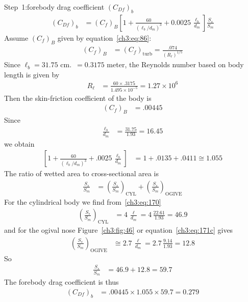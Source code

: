 \medskip\noindent Step~1:\quad forebody drag coefficient $(C_{Df})_b$
\begin{align*}
(C_{Df})_b &= (C_f)_B\left[1 + \frac{60}{(\ell_b/d_m)^3} + 0.0025\,\frac{\ell_b}{d_m}\right]\frac{S_s}{S_m}
\end{align*}
Assume $(C_f)_B$ given by equation~\eqref{ch3:eq:86}:
\begin{align*}
(C_f)_B &= (C_f)_{\mathrm{turb}} = \frac{.074}{(R_\ell)^{1/5}}
\end{align*}
Since $\ell_b = 31.75$ cm.\ $= 0.3175$ meter, the Reynolds number based on body length is
given by
\begin{align*}
R_\ell &= \frac{60 \times .3175}{1.495 \times 10^{-5}} = 1.27 \times 10^{6}
\end{align*}
Then the skin-friction coefficient of the body is
\begin{align*}
(C_f)_B &= .00445
\end{align*}
Since
\begin{align*}
\frac{\ell_b}{d_m} &= \frac{31.75}{1.93} = 16.45
\end{align*}
we obtain
\begin{align*}
\left[1 + \frac{60}{(\ell_b/d_m)^3} + .0025\,\frac{\ell_b}{d_m}\right] &= 1 + .0135 + .0411 \cong 1.055
\end{align*}
The ratio of wetted area to cross-sectional area is
\begin{align*}
\frac{S_s}{S_m} &= \left(\frac{S_s}{S_m}\right)_{\mathrm{CYL}} + \left(\frac{S_s}{S_m}\right)_{\mathrm{OGIVE}}
\end{align*}
For the cylindrical body we find from~\eqref{ch3:eq:170}
\begin{align*}
\left(\frac{S_s}{S_m}\right)_{\mathrm{CYL}} &= 4\,\frac{\ell}{d_m} = 4\,\frac{22.61}{1.93} = 46.9
\end{align*}
and for the ogival nose Figure~\ref{ch3:fig:46} or equation~\eqref{ch3:eq:171c} gives
\begin{align*}
\left(\frac{S_s}{S_m}\right)_{\mathrm{OGIVE}} &\cong 2.7\,\frac{\ell}{d_m} = 2.7\,\frac{9.14}{1.93} = 12.8
\end{align*}
So
\begin{align*}
\frac{S_s}{S_m} &= 46.9 + 12.8 = 59.7
\end{align*}
The forebody drag coefficient is thus
\begin{align*}
(C_{Df})_b &= .00445 \times 1.055 \times 59.7 = 0.279
\end{align*}


